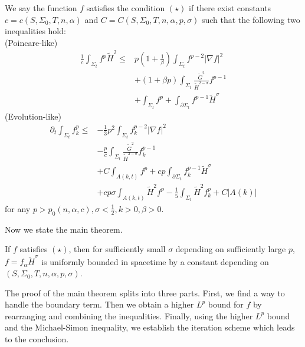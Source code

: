 We say the function $f$ satisfies the condition $(\star)$ if there exist constants $c=c(S, \Sigma_0,T,n,\alpha )$ and $C=C(S,\Sigma _0,T,n,\alpha ,p,\sigma )$ such that the following two inequalities hold:\\
(Poincare-like)
\begin{equation} \label{PLE}
\begin{split}
    \frac{1}{c}\int_{\Sigma_t} f^p \tilde{H}^2 
\leq &  p \left( 1+\frac{1}{\beta } \right) \int_{\Sigma_t} f^{p-2}\left| \nabla f \right| ^2  \\
&+\left( 1+\beta p \right) \int_{\Sigma_t} \frac{\tilde{G}^2}{\tilde{H}^{2-\sigma }}f^{p-1}\\
&+\int_{\Sigma_t} f^p+\int_{\partial \Sigma_t} f^{p-1}\tilde{H}^{\sigma }
\end{split}
\end{equation}
(Evolution-like)
\begin{equation} \label{ELE}
    \begin{split}
        \partial_t \int_{\Sigma_t} f_k^p
    \leq &  -\frac{1}{3}p^2 \int_{\Sigma_t} f_{k}^{p-2}\left| \nabla f \right| ^2  \\
    &-\frac{p}{c} \int_{\Sigma_t} \frac{\tilde{G}^2}{\tilde{H}^{2-\sigma }}f_{k}^{p-1}\\
    &+C \int_{A(k,t)} f^p+cp\int_{\partial \Sigma_t} f_{k}^{p-1}\tilde{H}^{\sigma }\\
    &+cp \sigma \int_{A(k,t)}^{}\tilde{H}^2f^p-\frac{1}{5}\int_{\Sigma_t} \tilde{H}^2f_{k}^{p}+C \left| A(k) \right| 
    \end{split}
    \end{equation}
for any $p>p_0(n,\alpha ,c), \sigma <\frac{1}{2}, k>0, \beta >0$. 

Now we state the main theorem.

\begin{theorem}
    If $f$ satisfies $(\star)$, then for sufficiently small $\sigma $ depending on sufficiently large $p$, $f=f_{\alpha }\tilde{H}^{\sigma }$ is uniformly bounded in spacetime by a constant depending on $(S,\Sigma _0,T,n,\alpha ,p,\sigma )$. 
\end{theorem}

The proof of the main theorem splits into three parts. First, we find a way to handle the boundary term. Then we obtain a higher $L^p$ bound for $f$ by rearranging and combining the inequalities. Finally, using the higher $L^p$ bound and the Michael-Simon inequality, we establish the iteration scheme which leads to the conclusion.


